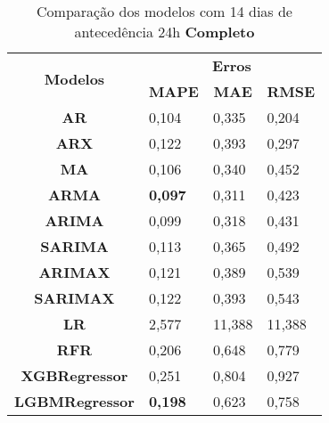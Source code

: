 \begin{table}[H]
	\centering
	\caption{Comparação dos modelos com 14 dias de antecedência 24h \textbf{Completo} }\label{tb:30-24cm}
	\begin{tabular}{@{}clll@{}}
		\toprule
		\multirow{2}{*}{\textbf{Modelos}} & \multicolumn{3}{c}{\textbf{Erros}}                                                                       \\ \cmidrule(l){2-4} 
		& \multicolumn{1}{c}{\textbf{MAPE}} & \multicolumn{1}{c}{\textbf{MAE}} & \multicolumn{1}{c}{\textbf{RMSE}} \\ \hline
\textbf{AR}                       & 0,104                             & 0,335                            & 0,204                             \\
\textbf{ARX}                      & 0,122                             & 0,393                            & 0,297                             \\
\textbf{MA}                       & 0,106                             & 0,340                            & 0,452                             \\
\textbf{ARMA}                     &\textbf{ 0,097}                             & 0,311                            & 0,423                             \\
\textbf{ARIMA}                    & 0,099                             & 0,318                            & 0,431                             \\
\textbf{SARIMA}                   & 0,113                             & 0,365                            & 0,492                             \\
\textbf{ARIMAX}                   & 0,121                             & 0,389                            & 0,539                             \\
\textbf{SARIMAX}                  & 0,122                             & 0,393                            & 0,543                             \\
\textbf{LR}                       & 2,577                             & 11,388                           & 11,388                            \\
\textbf{RFR}                      & 0,206                             & 0,648                            & 0,779                             \\
\textbf{XGBRegressor}             & 0,251                             & 0,804                            & 0,927                             \\
\textbf{LGBMRegressor}            & \textbf{0,198}                             & 0,623                            & 0,758                             \\ \bottomrule
	\end{tabular}

\end{table}


